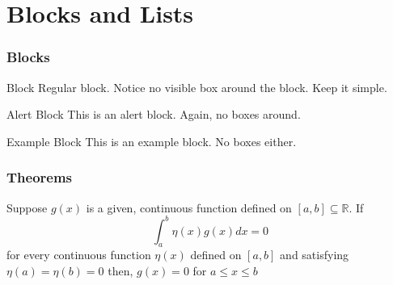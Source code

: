 \documentclass[11pt,xcolor={svgnames},aspectratio=169,usepdftitle=false,notheorems]{beamer}
\begin{document}
\section{Blocks and Lists}

\begin{frame}
	\frametitle{Blocks}
\begin{block}{Block}
Regular block. Notice no visible box around the block. Keep it simple.
\end{block}

\begin{alertblock}{Alert Block}
This is an alert block. Again, no boxes around.
\end{alertblock}

\begin{exampleblock}{Example Block}
This is an example block. No boxes either.
\end{exampleblock}
\end{frame}

\begin{frame}
	\frametitle{Theorems}
\begin{theorem}
Suppose $g(x)$ is a given, continuous function defined on $[a,b]\subseteq\mathbb{R}$. If
	\[
	\int_a^b \eta(x)g(x) dx = 0
	\]
for every continuous function $\eta(x)$ defined on $[a,b]$ and satisfying $\eta(a) = \eta(b) = 0$ then, $g(x) = 0$ for $a\leq x\leq b$
\end{theorem}
\end{frame}
\end{document}
